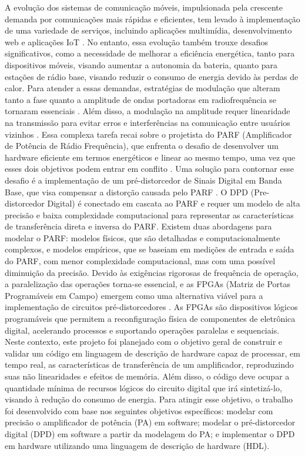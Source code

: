 A evolução dos sistemas de comunicação móveis, impulsionada pela crescente demanda por comunicações mais rápidas e eficientes, tem levado à implementação de uma variedade de serviços, incluindo aplicações multimídia, desenvolvimento web e aplicações IoT \cite{John2016}. No entanto, essa evolução também trouxe desafios significativos, como a necessidade de melhorar a eficiência energética, tanto para dispositivos móveis, visando aumentar a autonomia da bateria, quanto para estações de rádio base, visando reduzir o consumo de energia devido às perdas de calor. Para atender a essas demandas, estratégias de modulação que alteram tanto a fase quanto a amplitude de ondas portadoras em radiofrequência se tornaram essenciais \cite{Kenington2000}. Além disso, a modulação na amplitude requer linearidade na transmissão para evitar erros e interferências na comunicação entre usuários vizinhos \cite{Cripps2006}. Essa complexa tarefa recai sobre o projetista do PARF (Amplificador de Potência de Rádio Frequência), que enfrenta o desafio de desenvolver um hardware eficiente em termos energéticos e linear ao mesmo tempo, uma vez que esses dois objetivos podem entrar em conflito \cite{Chavez2018}. Uma solução para contornar esse desafio é a implementação de um pré-distorcedor de Sinais Digital em Banda Base, que visa compensar a distorção causada pelo PARF \cite{Cripps2006}. O DPD (Pre-distorcedor Digital) é conectado em cascata ao PARF e requer um modelo de alta precisão e baixa complexidade computacional para representar as características de transferência direta e inversa do PARF. Existem duas abordagens para modelar o PARF: modelos físicos, que são detalhadas e computacionalmente complexos, e modelos empíricos, que se baseiam em medições de entrada e saída do PARF, com menor complexidade computacional, mas com uma possível diminuição da precisão. Devido às exigências rigorosas de frequência de operação, a paralelização das operações torna-se essencial, e as FPGAs (Matriz de Portas Programáveis em Campo) emergem como uma alternativa viável para a implementação de circuitos pré-distorcedores \cite{Pedroni2010}. As FPGAs são dispositivos lógicos programáveis que permitem a reconfiguração física de componentes de eletrônica digital, acelerando processos e suportando operações paralelas e sequenciais. 
Neste contexto, este projeto foi planejado com o objetivo geral de construir e validar um código em linguagem de descrição de hardware capaz de processar, em tempo real, as características de transferência de um amplificador, reproduzindo suas não linearidades e efeitos de memória. Além disso, o código deve ocupar a quantidade mínima de recursos lógicos do circuito digital que irá sintetizá-lo, visando à redução do consumo de energia. Para atingir esse objetivo, o trabalho foi desenvolvido com base nos seguintes objetivos específicos: modelar com precisão o amplificador de potência (PA) em software; modelar o pré-distorcedor digital (DPD) em software a partir da modelagem do PA; e implementar o DPD em hardware utilizando uma linguagem de descrição de hardware (HDL).


